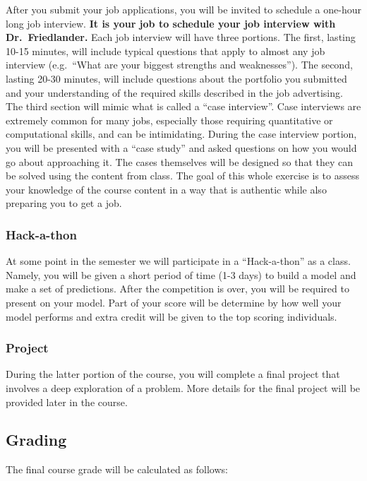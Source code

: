 \documentclass[
  letterpaper,
  DIV=11,
  numbers=noendperiod]{scrartcl}
\begin{document}
After you submit your job applications, you will be invited to schedule
a one-hour long job interview. \textbf{It is your job to schedule your
job interview with Dr.~Friedlander.} Each job interview will have three
portions. The first, lasting 10-15 minutes, will include typical
questions that apply to almost any job interview (e.g.~``What are your
biggest strengths and weaknesses''). The second, lasting 20-30 minutes,
will include questions about the portfolio you submitted and your
understanding of the required skills described in the job advertising.
The third section will mimic what is called a ``case interview''. Case
interviews are extremely common for many jobs, especially those
requiring quantitative or computational skills, and can be intimidating.
During the case interview portion, you will be presented with a ``case
study'' and asked questions on how you would go about approaching it.
The cases themselves will be designed so that they can be solved using
the content from class. The goal of this whole exercise is to assess
your knowledge of the course content in a way that is authentic while
also preparing you to get a job.

\subsubsection{Hack-a-thon}\label{hack-a-thon}

At some point in the semester we will participate in a ``Hack-a-thon''
as a class. Namely, you will be given a short period of time (1-3 days)
to build a model and make a set of predictions. After the competition is
over, you will be required to present on your model. Part of your score
will be determine by how well your model performs and extra credit will
be given to the top scoring individuals.

\subsubsection{Project}\label{project}

During the latter portion of the course, you will complete a final
project that involves a deep exploration of a problem. More details for
the final project will be provided later in the course.

\subsection{Grading}\label{grading}

The final course grade will be calculated as follows:
\end{document}
